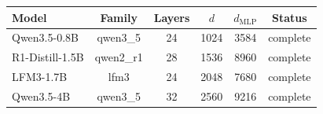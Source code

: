 \begin{tabular}{lccccc}
\toprule
Model & Family & Layers & $d$ & $d_{\mathrm{MLP}}$ & Status \\
\midrule
Qwen3.5-0.8B & qwen3\_5 & 24 & 1024 & 3584 & complete \\
R1-Distill-1.5B & qwen2\_r1 & 28 & 1536 & 8960 & complete \\
LFM3-1.7B & lfm3 & 24 & 2048 & 7680 & complete \\
Qwen3.5-4B & qwen3\_5 & 32 & 2560 & 9216 & complete \\
\bottomrule
\end{tabular}